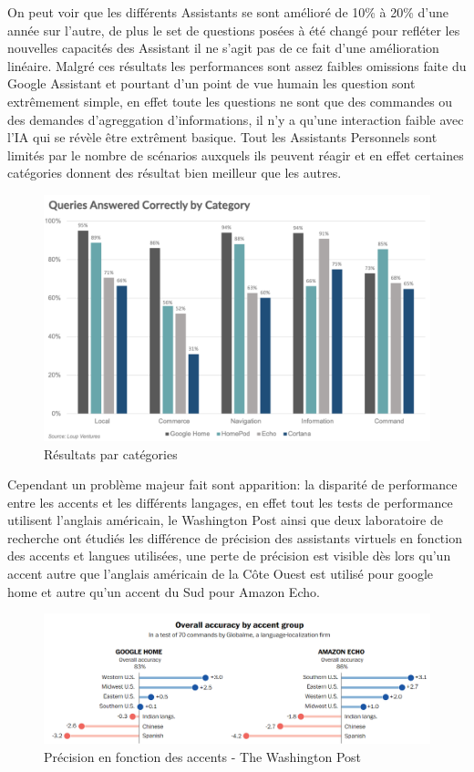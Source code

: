 On peut voir que les différents Assistants se sont amélioré de 10\% à 20\% d'une année sur l'autre,
de plus le set de questions posées à été changé pour refléter les nouvelles capacités des Assistant 
il ne s'agit pas de ce fait d'une amélioration linéaire. Malgré ces résultats les performances 
sont assez faibles omissions faite du Google Assistant et pourtant d'un point de vue 
humain les question sont extrêmement simple, en effet toute les questions ne sont que des commandes ou 
des demandes d'agreggation d'informations, il n'y a qu'une interaction faible avec l'IA qui se révèle 
être extrêment basique. Tout les Assistants Personnels sont limités par le nombre de scénarios auxquels 
ils peuvent réagir et en effet certaines catégories donnent des résultat bien meilleur que les 
autres. \newpage

\begin{figure}[H]
    \centering
    \includegraphics[width=1.0\textwidth]{Images/vaquerybycategory}
    \caption{Résultats par catégories}
    \label{fig:watsonlogo}
\end{figure}

Cependant un problème majeur fait sont apparition: la disparité de performance entre les accents 
et les différents langages, en effet tout les tests de performance utilisent l'anglais américain,
le Washington Post ainsi que deux laboratoire de recherche ont étudiés les différence 
de précision des assistants virtuels en fonction des accents et langues utilisées, une
perte de précision est visible dès lors qu'un accent autre que l'anglais américain de la Côte Ouest
est utilisé pour google home et autre qu'un accent du Sud pour Amazon Echo.

\begin{figure}[H]
    \centering
    \includegraphics[width=1.0\textwidth]{Images/accuracyperaccent}
    \caption{Précision en fonction des accents - The Washington Post}
    \label{fig:accentaccuracy}
\end{figure}

